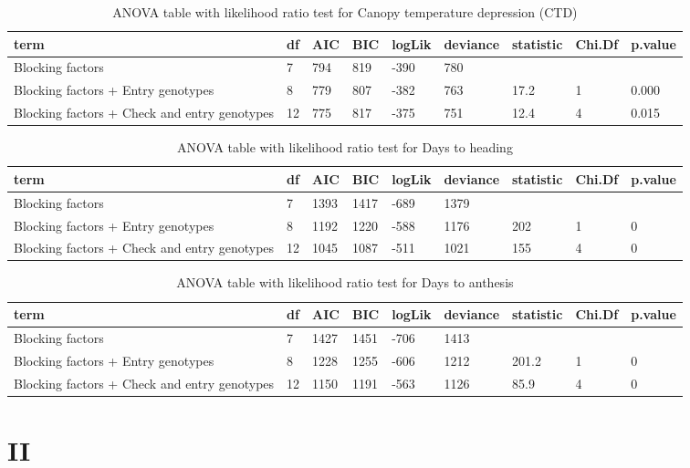 \documentclass[12pt,oneside]{dukestatscithesis} %
\begin{document}
\begin{table}[H]

\caption{\label{tab:unnamed-chunk-5}\label{tab:lrt-ctd}ANOVA table with likelihood ratio test for Canopy temperature depression (CTD)}
\centering
\begin{tabular}[t]{>{\raggedright\arraybackslash}p{3.5cm}llllllll}
\toprule
term & df & AIC & BIC & logLik & deviance & statistic & Chi.Df & p.value\\
\midrule
Blocking factors & 7 & 794 & 819 & -390 & 780 &  &  & \\
Blocking factors + Entry genotypes & 8 & 779 & 807 & -382 & 763 & 17.2 & 1 & 0.000\\
Blocking factors + Check and entry genotypes & 12 & 775 & 817 & -375 & 751 & 12.4 & 4 & 0.015\\
\bottomrule
\end{tabular}
\end{table}
\begin{table}[H]

\caption{\label{tab:unnamed-chunk-5}\label{tab:lrt-dth}ANOVA table with likelihood ratio test for Days to heading}
\centering
\begin{tabular}[t]{>{\raggedright\arraybackslash}p{3.5cm}llllllll}
\toprule
term & df & AIC & BIC & logLik & deviance & statistic & Chi.Df & p.value\\
\midrule
Blocking factors & 7 & 1393 & 1417 & -689 & 1379 &  &  & \\
Blocking factors + Entry genotypes & 8 & 1192 & 1220 & -588 & 1176 & 202 & 1 & 0\\
Blocking factors + Check and entry genotypes & 12 & 1045 & 1087 & -511 & 1021 & 155 & 4 & 0\\
\bottomrule
\end{tabular}
\end{table}
\begin{table}[H]

\caption{\label{tab:unnamed-chunk-5}\label{tab:lrt-dta}ANOVA table with likelihood ratio test for Days to anthesis}
\centering
\begin{tabular}[t]{>{\raggedright\arraybackslash}p{3.5cm}llllllll}
\toprule
term & df & AIC & BIC & logLik & deviance & statistic & Chi.Df & p.value\\
\midrule
Blocking factors & 7 & 1427 & 1451 & -706 & 1413 &  &  & \\
Blocking factors + Entry genotypes & 8 & 1228 & 1255 & -606 & 1212 & 201.2 & 1 & 0\\
Blocking factors + Check and entry genotypes & 12 & 1150 & 1191 & -563 & 1126 & 85.9 & 4 & 0\\
\bottomrule
\end{tabular}
\end{table}
\hypertarget{ii}{%
\chapter{II}\label{ii}}
\end{document}
